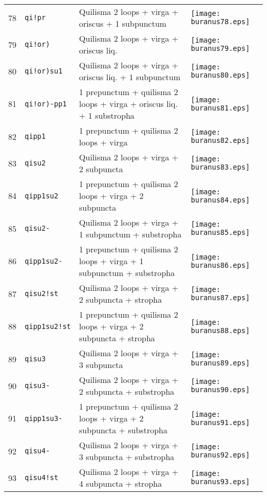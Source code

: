 \documentclass{scrarticle}
\begin{document}
\begin{longtable}{l|l|l|l}
78 & \texttt{qi!pr} & Quilisma 2 loops + virga + oriscus + 1 subpunctum & \texttt{[image: buranus78.eps]} \\
79 & \texttt{qi!or)} & Quilisma 2 loops + virga + oriscus liq. & \texttt{[image: buranus79.eps]} \\
80 & \texttt{qi!or)su1} & Quilisma 2 loops + virga + oriscus liq. + 1 subpunctum & \texttt{[image: buranus80.eps]} \\
81 & \texttt{qi!or)-pp1} & 1 prepunctum + quilisma 2 loops + virga + oriscus liq. + 1 substropha & \texttt{[image: buranus81.eps]} \\
82 & \texttt{qipp1} & 1 prepunctum + quilisma 2 loops + virga & \texttt{[image: buranus82.eps]} \\
83 & \texttt{qisu2} & Quilisma 2 loops + virga + 2 subpuncta & \texttt{[image: buranus83.eps]} \\
84 & \texttt{qipp1su2} & 1 prepunctum + quilisma 2 loops + virga + 2 subpuncta & \texttt{[image: buranus84.eps]} \\
85 & \texttt{qisu2-} & Quilisma 2 loops + virga + 1 subpunctum + substropha & \texttt{[image: buranus85.eps]} \\
86 & \texttt{qipp1su2-} & 1 prepunctum + quilisma 2 loops + virga + 1 subpunctum + substropha & \texttt{[image: buranus86.eps]} \\
87 & \texttt{qisu2!st} & Quilisma 2 loops + virga + 2 subpuncta + stropha & \texttt{[image: buranus87.eps]} \\
88 & \texttt{qipp1su2!st} & 1 prepunctum + quilisma 2 loops + virga + 2 subpuncta + stropha & \texttt{[image: buranus88.eps]} \\
89 & \texttt{qisu3} & Quilisma 2 loops + virga + 3 subpuncta & \texttt{[image: buranus89.eps]} \\
90 & \texttt{qisu3-} & Quilisma 2 loops + virga + 2 subpuncta + substropha & \texttt{[image: buranus90.eps]} \\
91 & \texttt{qipp1su3-} & 1 prepunctum + quilisma 2 loops + virga + 2 subpuncta + substropha & \texttt{[image: buranus91.eps]} \\
92 & \texttt{qisu4-} & Quilisma 2 loops + virga + 3 subpuncta + substropha & \texttt{[image: buranus92.eps]} \\
93 & \texttt{qisu4!st} & Quilisma 2 loops + virga + 4 subpuncta + stropha & \texttt{[image: buranus93.eps]} \\

\end{longtable}
\end{document}
